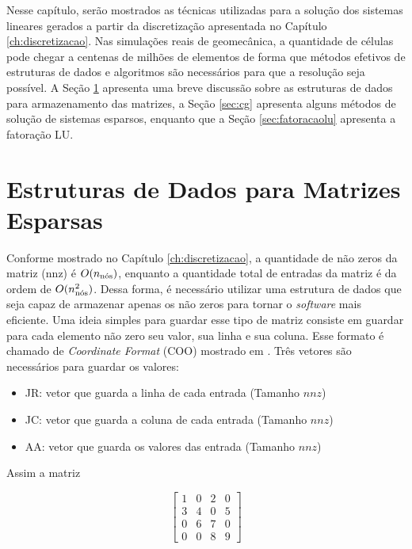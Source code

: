 

Nesse capítulo, serão mostrados as técnicas utilizadas para a solução dos sistemas lineares gerados a partir da discretização apresentada no Capítulo \ref{ch:discretizacao}. Nas simulações reais de geomecânica, a quantidade de células pode chegar a centenas de milhões de elementos de forma que métodos efetivos de estruturas de dados e algoritmos são necessários para que a resolução seja possível. A Seção \ref{sec:csr} apresenta uma breve discussão sobre as estruturas de dados para armazenamento das matrizes, a Seção \ref{sec:cg} apresenta alguns métodos de solução de sistemas esparsos, enquanto que a Seção \ref{sec:fatoracaolu} apresenta a fatoração LU.


\section{Estruturas de Dados para Matrizes Esparsas} \label{sec:csr}

Conforme mostrado no Capítulo \ref{ch:discretizacao}, a quantidade de não zeros da matriz (nnz) é $O(\qtdnos)$, enquanto a quantidade total de entradas da matriz é da ordem de $O(\qtdnos^2)$. Dessa forma, é necessário utilizar uma estrutura de dados que seja capaz de  armazenar apenas os não zeros para tornar o \textit{software} mais eficiente.  Uma ideia simples para guardar esse tipo de matriz consiste em guardar para cada elemento não zero seu valor, sua linha e sua coluna. Esse formato é chamado de \textit{Coordinate Format} (COO) mostrado em \citet{solverlinear}. Três vetores são necessários para guardar os valores:


\begin{itemize}
    \item JR: vetor que guarda a linha de cada entrada (Tamanho $nnz$)
    \item JC: vetor que guarda a coluna de cada entrada (Tamanho $nnz$)
    \item AA: vetor que guarda os valores das entrada (Tamanho $nnz$)
\end{itemize}


Assim a matriz


\begin{equation}
    \begin{bmatrix}
        1 & 0 & 2 & 0\\
        3 & 4 & 0 & 5\\
        0 & 6 & 7 & 0\\
        0 & 0 & 8 &9
    \end{bmatrix}
\end{equation}

